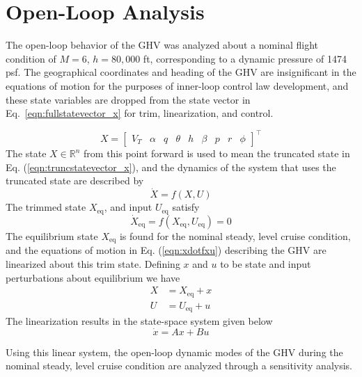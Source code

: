 \documentclass[]{../sty/aiaa-tc}
\begin{document}
  \section{Open-Loop Analysis}

  The open-loop behavior of the GHV was analyzed about a nominal flight condition of $M=6$, $h=80,000$ ft, corresponding to a dynamic pressure of 1474 psf.
  The geographical coordinates and heading of the GHV are insignificant in the equations of motion for the purposes of inner-loop control law development\cite{journal:billimoriaschmidt1995}, and these state variables are dropped from the state vector in Eq.\ \eqref{eqn:fullstatevector_x} for trim, linearization, and control.

  \begin{equation}
    \label{eqn:truncstatevector_x}
    X=\left[
    \begin{array}{ccccccccc}
      V_{T} &  \alpha & q &\theta & h & \beta &p & r & \phi
    \end{array}\right]^{\top}
  \end{equation}
  The state $X\in\mathbb{R}^{n}$ from this point forward is used to mean the truncated state in Eq. (\ref{eqn:truncstatevector_x}), and the dynamics of the system that uses the truncated state are described by
  \begin{equation}
    \label{eqn:xdotfxu}
    \dot{X}=f({X},U)
  \end{equation}
  The trimmed state $X_{\text{eq}}$, and input $U_{\text{eq}}$ satisfy
  \begin{equation}
    \label{eqn:eqptdef}
    \dot{X}_{\text{eq}}=f({X}_{\text{eq}},U_{\text{eq}})=0
  \end{equation}
  The equilibrium state $X_{\text{eq}}$ is found for the nominal steady, level cruise condition, and the equations of motion in Eq. (\ref{eqn:xdotfxu}) describing the GHV are linearized about this trim state.
  Defining $x$ and $u$ to be state and input perturbations about equilibrium we have
  \begin{align*}
    X&=X_{\text{eq}}+x \\
    U&=U_{\text{eq}}+u
  \end{align*}
  The linearization results in the state-space system given below
  \begin{equation}
    \label{eqn:linss}
    \dot{x}=Ax+Bu
  \end{equation}

  Using this linear system, the open-loop dynamic modes of the GHV during the nominal steady, level cruise condition are analyzed through a sensitivity analysis.
\end{document}
